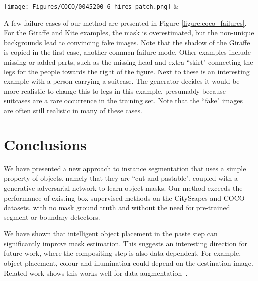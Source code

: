 \documentclass[runningheads]{llncs}
\begin{document}
\texttt{[image: Figures/COCO/0045200\_6\_hires\_patch.png]} &%

A few failure cases of our method are presented in Figure \ref{figure:coco_failures}. For the Giraffe and Kite examples, the mask is overestimated, but the non-unique backgrounds lead to convincing fake images. Note that the shadow of the Giraffe is copied in the first case, another common failure mode.
Other examples include missing or added parts, such as the missing head and extra ``skirt" connecting the legs for the people towards the right of the figure. Next to these is an interesting example with a person carrying a suitcase. The generator decides it would be more realistic to change this to legs in this example, presumably because suitcases are a rare occurrence in the training set. 
Note that the ``fake" images are often still realistic in many of these cases.


\section{Conclusions}
We have presented a new approach to instance segmentation that uses a simple property of objects, namely that they are ``cut-and-pastable", coupled with a generative adversarial network to learn object masks. Our method exceeds the performance of existing box-supervised methods on the CityScapes and COCO datasets, with no mask ground truth and without the need for pre-trained segment or boundary detectors.


We have shown that intelligent object placement in the paste step can significantly improve mask estimation. This suggests an interesting direction for future work, where the compositing step is also data-dependent. For example, object placement, colour and illumination could depend on the destination image. Related work shows this works well for data augmentation~\cite{dwibedi2017cut,georgakis2017synthesizing,alhaija2017augmented}. 
\end{document}

